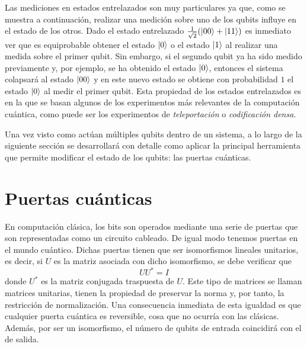 Las mediciones en estados entrelazados son muy particulares ya que, como se muestra a continuación, realizar una medición sobre uno de los qubits influye en el estado de los otros.
%
Dado el estado entrelazado $\tfrac{1}{\sqrt{2}}(\left|00\right\rangle + \left|11\right\rangle)$ es inmediato ver que es equiprobable obtener el estado $\left|0\right\rangle$ o el estado $\left|1\right\rangle$ al realizar una medida sobre el primer qubit. Sin embargo, si el segundo qubit ya ha sido medido previamente y, por ejemplo, se ha obtenido el estado $\left|0\right\rangle$, entonces el sistema colapsará al estado $\left|00\right\rangle$ y en este nuevo estado se obtiene con probabilidad $1$ el estado $\left|0\right\rangle$ al medir el primer qubit. Esta propiedad de los estados entrelazados es en la que se basan algunos de los experimentos más relevantes de la computación cuántica, como puede ser los experimentos de \textit{teleportación} o \textit{codificación densa}. 

Una vez visto como actúan múltiples qubits dentro de un sistema, a lo largo de la siguiente sección se desarrollará con detalle como aplicar la principal herramienta que permite modificar el estado de los qubits: las puertas cuánticas.

\section{Puertas cuánticas}
En computación clásica, los bits son operados mediante una serie de puertas que son representadas como un circuito cableado. De igual modo tenemos puertas en el mundo cuántico. Dichas puertas tienen que ser isomorfismos lineales unitarios, es decir, si $U$ es la matriz asociada con dicho isomorfismo, se debe verificar que
\[UU^*=I \]
donde $U^*$ es la matriz conjugada traspuesta de $U$. Este tipo de matrices se llaman matrices unitarias, tienen la propiedad de preservar la norma y, por tanto, la restricción de normalización. Una consecuencia inmediata de esta igualdad es que cualquier puerta cuántica es reversible, cosa que no ocurría con las clásicas. Además, por ser un isomorfismo, el número de qubits de entrada coincidirá con el de salida.


